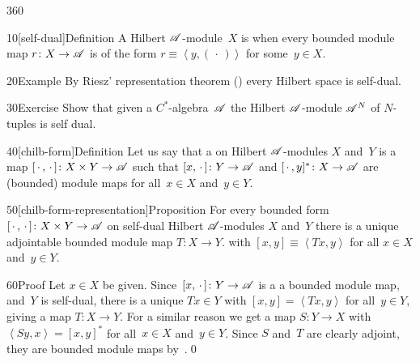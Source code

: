 \begin{parsec}{360}%
\begin{point}{10}[self-dual]{Definition}%
A Hilbert $\mathscr{A}$-module~$X$ is %
when every bounded module map $r\colon X\to \mathscr{A}$
is of the form $r\equiv \left<y,(\,\cdot\,)\right>$
for some~$y\in X$.
\end{point}
\begin{point}{20}{Example}%
By Riesz' representation theorem ()
every Hilbert space is self-dual.
\end{point}
\begin{point}{30}{Exercise}%
Show that given a $C^*$-algebra~$\mathscr{A}$
the Hilbert $\mathscr{A}$-module $\mathscr{A}^{N}$
of $N$-tuples is self dual.
\end{point}
\begin{point}{40}[chilb-form]{Definition}%
Let us say that a %
%
on Hilbert $\mathscr{A}$-modules
$X$ and~$Y$
is a map $[\,\cdot\,,\,\cdot\,]\colon X\times Y\to \mathscr{A}$
such that $[x,\,\cdot\,]\colon Y\to \mathscr{A}$
and $[\,\cdot\,,y]^*\colon X\to \mathscr{A}$
are (bounded) module maps for all~$x\in X$ and~$y\in Y$.
\end{point}
\begin{point}{50}[chilb-form-representation]{Proposition}%
For every bounded form  $[\,\cdot\,,\,\cdot\,]\colon X\times Y\rightarrow \mathscr{A}$
on self-dual Hilbert $\mathscr{A}$-modules
$X$ and~$Y$
there is a unique adjointable bounded module map
$T\colon X\to Y$.
with
$[x,y]\equiv \left<Tx,y\right>$
for all $x\in X$ and~$y\in Y$.
\begin{point}{60}{Proof}%
Let $x\in X$ be given.
Since~$[x,\,\cdot\,]\colon Y\to \mathscr{A}$ is a
a bounded module map,
and~$Y$ is self-dual,
there is a unique $Tx\in Y$ with
$[x,y]=\left<Tx,y\right>$
for all~$y\in Y$,
giving a map $T\colon X\to Y$.
For a similar reason
we get a map $S\colon Y\to X$
with $\left<Sy,x\right>=[x,y]^*$ 
for all~$x\in X$ and~$y\in Y$.
Since $S$ and~$T$ are clearly adjoint,
they are bounded module maps by~.\qed
\end{point}
\end{point}
\end{parsec}
